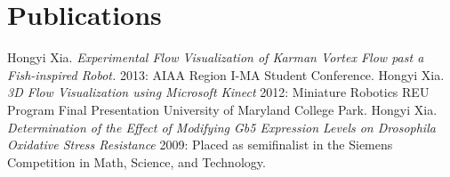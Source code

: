 \documentclass[10pt,a4paper,sans]{moderncv}        %
\begin{document}

\section{Publications}
%
\begin{thebibliography}{1}
 Hongyi Xia. {\em Experimental Flow Visualization of Karman Vortex Flow past a Fish-inspired Robot.}  2013: AIAA Region I-MA Student Conference.
  Hongyi Xia. {\em 3D Flow Visualization using Microsoft Kinect} 2012:
Miniature Robotics REU Program Final Presentation University of Maryland College Park.
 Hongyi Xia. {\em Determination of the Effect of Modifying Gb5 Expression Levels on Drosophila Oxidative Stress Resistance} 2009: Placed as semifinalist in the Siemens Competition in Math, Science, and Technology.
\end{thebibliography}



\end{document}

